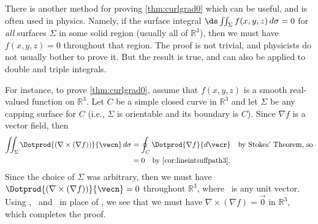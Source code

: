 There is another method for proving \autoref{thm:curlgrad0} which can be useful, and is often used in physics. Namely, if the surface integral $\ds\iint_{\Sigma} f(x,y,z)\,d\sigma = 0$ for \emph{all} surfaces $\Sigma$ in some solid region (usually all of $\mathbb{R}^{3}$), then we must have $f(x,y,z) = 0$ throughout that region. The proof is not trivial, and physicists do not usually bother to prove it. But the result is true, and can also be applied to double and triple integrals.

For instance, to prove \autoref{thm:curlgrad0}, assume that $f(x,y,z)$ is a smooth real-valued function on $\mathbb{R}^{3}$. Let $C$ be a simple closed curve in $\mathbb{R}^{3}$ and let $\Sigma$ be any capping surface for $C$ (i.e., $\Sigma$ is orientable and its boundary is $C$). Since $\nabla f$ is a vector field, then
\begin{align*}
 \iint_{\Sigma} \Dotprod{\left( \nabla\times(\nabla f) \right) }{\vecn}\,d\sigma &=
  \oint_{C}\Dotprod{\nabla f}{d\vecr} \quad\text{by Stokes' Theorem, so}\\
 &= 0 \quad\text{by \autoref{cor:lineintsuffpath3}.}
\end{align*}
Since the choice of $\Sigma$ was arbitrary, then we must have $\Dotprod{(\nabla\times(\nabla f))}{\vecn} = 0$ throughout $\mathbb{R}^{3}$, where \vecn\ is any unit vector. Using \veci, \vecj\ and \veck\ in place of \vecn, we see that we must have $\nabla\times(\nabla f) = \vec0$ in $\mathbb{R}^{3}$, which completes the proof.


